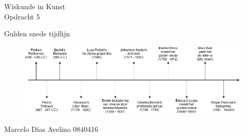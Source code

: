 \documentclass{article}
\begin{document}
\begin{center}
	\huge{Wiskunde in Kunst}\\
	\LARGE{Opdracht 5} \\
	
	\vspace{2cm}
	
	\Large{Gulden snede tijdlijn}\\
	
	\vfill
	
	\begin{figure}[Hh]
		\centering
	    \includegraphics[width=\textwidth]{gulden-snede-timeline}
	\end{figure}
	
	\vfill
	\Large{Marcelo Dias Avelino} \hfill \large{0840416}
\end{center}

\thispagestyle{empty} %
\end{document}
